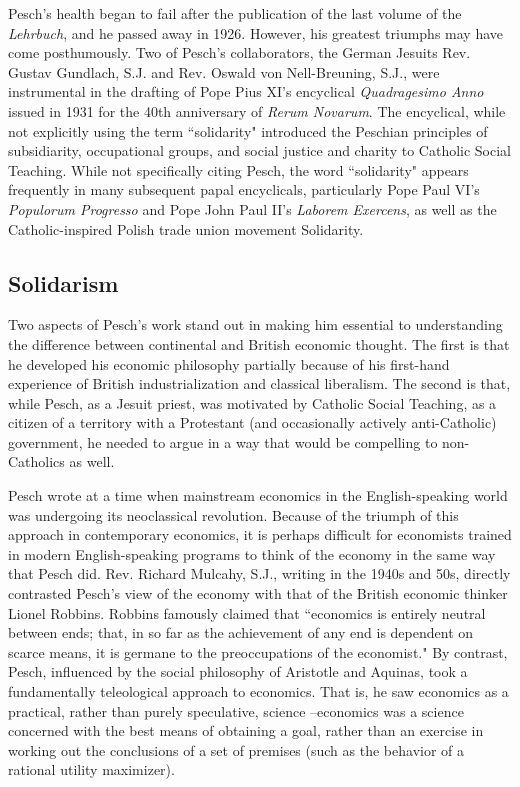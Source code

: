 \documentclass{article}
\begin{document}
Pesch’s health began to fail after the publication of the last volume of the \emph{Lehrbuch}, and he passed away in 1926.  However, his greatest triumphs may have come posthumously.  Two of Pesch’s collaborators, the German Jesuits Rev. Gustav Gundlach, S.J. and Rev. Oswald von Nell-Breuning, S.J., were instrumental in the drafting of Pope Pius XI’s encyclical \emph{Quadragesimo Anno} issued in 1931 for the 40th anniversary of \emph{Rerum Novarum}.  The encyclical, while not explicitly using the term ``solidarity" introduced the Peschian principles of subsidiarity, occupational groups, and social justice and charity to Catholic Social Teaching. \citep{ederer1991}  While not specifically citing Pesch, the word ``solidarity" appears frequently in many subsequent papal encyclicals, particularly Pope Paul VI’s \emph{Populorum Progresso} and Pope John Paul II’s \emph{Laborem Exercens}, as well as the Catholic-inspired Polish trade union movement Solidarity.

\subsection{Solidarism}

Two aspects of Pesch’s work stand out in making him essential to understanding the difference between continental and British economic thought.  The first is that he developed his economic philosophy partially because of his first-hand experience of British industrialization and classical liberalism.  The second is that, while Pesch, as a Jesuit priest, was motivated by Catholic Social Teaching, as a citizen of a territory with a Protestant (and occasionally actively anti-Catholic) government, he needed to argue in a way that would be compelling to non-Catholics as well.\medskip

Pesch wrote at a time when mainstream economics in the English-speaking world was undergoing its neoclassical revolution.  Because of the triumph of this approach in contemporary economics, it is perhaps difficult for economists trained in modern English-speaking programs to think of the economy in the same way that Pesch did.  Rev. Richard Mulcahy, S.J., writing in the 1940s and 50s, directly contrasted Pesch’s view of the economy with that of the British economic thinker Lionel Robbins. \citep{mulcahy1949}  Robbins famously claimed that ``economics is entirely neutral between ends; that, in so far as the achievement of any end is dependent on scarce means, it is germane to the preoccupations of the economist." \citep[p.23]{robbins1932}  By contrast, Pesch, influenced by the social philosophy of Aristotle and Aquinas, took a fundamentally teleological approach to economics.  That is, he saw economics as a practical, rather than purely speculative, science –economics was a science concerned with the best means of obtaining a goal, rather than an exercise in working out the conclusions of a set of premises (such as the behavior of a rational utility maximizer).\medskip
\end{document}
